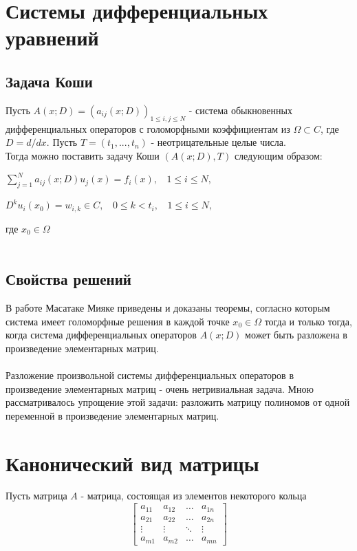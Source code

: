 \documentclass[14pt, a4paper]{extreport}
\begin{document}
	\chapter{Системы дифференциальных уравнений}
		\section{Задача Коши}
		Пусть $A(x;D) = (a_{ij}(x;D))_{1 \leq i, j \leq N}$ - система обыкновенных
		дифференциальных операторов с голоморфными коэффициентам из $\Omega \subset C$,
		где $D = d/dx$. Пусть $T = (t_1,...,t_n)$ - неотрицательные целые числа. \\
		Тогда можно поставить задачу Коши $(A(x;D), T)$ следующим образом:
		\begin{center}
			$\sum\limits_{j=1}^N a_{ij}(x;D)u_j(x) = f_i(x), \ \ \ \ 1 \leq i \leq N,$
		\end{center}
		\begin{center}
			$D^ku_i(x_0) = w_{i, k} \in C,\ \ \ \ 0 \leq k < t_i, \ \ \ \ 1 \leq i \leq N, $
		\end{center}
		где $x_0 \in \Omega$\\\\
		\section{Свойства решений}
		В работе \cite{miyake} Масатаке Мияке приведены и доказаны теоремы, согласно которым система
		имеет голоморфные решения в каждой точке $x_0 \in \Omega$ тогда и только тогда,
		когда система дифференциальных операторов $A(x;D)$ может быть разложена
		в произведение элементарных матриц. \\\\
		Разложение произвольной системы дифференциальных операторов в произведение
		элементарных матриц - очень нетривиальная задача. Мною рассматривалось упрощение
		этой задачи: разложить матрицу полиномов от одной переменной в произведение
		элементарных матриц.
	\newpage
	\chapter{Канонический вид матрицы}
		Пусть матрица $A$ - матрица, состоящая из элементов некоторого кольца
		\[
		\begin{bmatrix}
			a_{11} & a_{12} & \dots & a_{1n} \\
			a_{21} & a_{22} & \dots & a_{2n} \\
			\vdots & \vdots & \ddots & \vdots \\
			a_{m1} & a_{m2} & \dots & a_{mn}
		\end{bmatrix}
		\]
\end{document}
